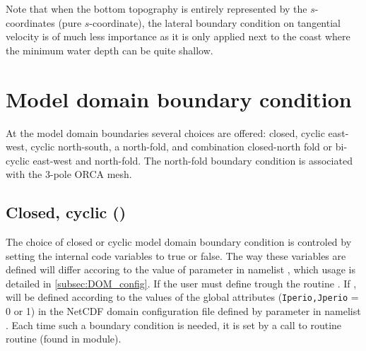 \documentclass[../main/NEMO_manual]{subfiles}
\begin{document}
Note that when the bottom topography is entirely represented by the $s$-coordinates (pure $s$-coordinate),
the lateral boundary condition on tangential velocity is of much less importance as
it is only applied next to the coast where the minimum water depth can be quite shallow.

\section{Model domain boundary condition}
\label{sec:LBC_jperio}

At the model domain boundaries several choices are offered:
closed, cyclic east-west, cyclic north-south, a north-fold, and combination closed-north fold or
bi-cyclic east-west and north-fold.
The north-fold boundary condition is associated with the 3-pole ORCA mesh.

\subsection{Closed, cyclic ()}
\label{subsec:LBC_jperio012}

The choice of closed or cyclic model domain boundary condition is controled by
setting the internal code variables  to true or false.
The way these variables are defined will differ accoring to the value of  parameter in
namelist , which usage is detailed in \autoref{subsec:DOM_config}. If  the user must define  trough the routine . If ,  will be defined according to the values of the global attributes (\texttt{Iperio,Jperio} = 0 or 1) in the NetCDF domain configuration file defined by  parameter in namelist .
Each time such a boundary condition is needed, it is set by a call to routine  routine (found in  module).
\end{document}
